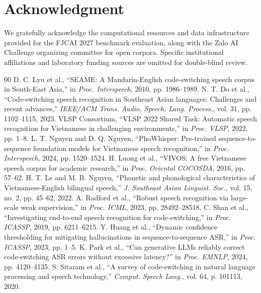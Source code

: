 \documentclass[9pt, conference, a4paper, compsocconf]{IEEEtran}
\begin{document}
\section*{Acknowledgment}
We gratefully acknowledge the computational resources and data infrastructure provided for the FJCAI 2027 benchmark evaluation, along with the Zalo AI Challenge organizing committee for open corpora. Specific institutional affiliations and laboratory funding sources are omitted for double-blind review.

\begin{thebibliography}{00}
 D. C. Lyu et al., ``SEAME: A Mandarin-English code-switching speech corpus in South-East Asia,'' in \textit{Proc. Interspeech}, 2010, pp. 1986--1989.
 N. T. Do et al., ``Code-switching speech recognition in Southeast Asian languages: Challenges and recent advances,'' \textit{IEEE/ACM Trans. Audio, Speech, Lang. Process.}, vol. 31, pp. 1102--1115, 2023.
 VLSP Consortium, ``VLSP 2022 Shared Task: Automatic speech recognition for Vietnamese in challenging environments,'' in \textit{Proc. VLSP}, 2022, pp. 1--8.
 L. T. Nguyen and D. Q. Nguyen, ``PhoWhisper: Pre-trained sequence-to-sequence foundation models for Vietnamese speech recognition,'' in \textit{Proc. Interspeech}, 2024, pp. 1520--1524.
 H. Luong et al., ``VIVOS: A free Vietnamese speech corpus for academic research,'' in \textit{Proc. Oriental COCOSDA}, 2016, pp. 57--62.
 H. T. Le and M. B. Nguyen, ``Phonetic and phonological characteristics of Vietnamese-English bilingual speech,'' \textit{J. Southeast Asian Linguist. Soc.}, vol. 15, no. 2, pp. 45--62, 2022.
 A. Radford et al., ``Robust speech recognition via large-scale weak supervision,'' in \textit{Proc. ICML}, 2023, pp. 28492--28518.
 C. Shan et al., ``Investigating end-to-end speech recognition for code-switching,'' in \textit{Proc. ICASSP}, 2019, pp. 6211--6215.
 Y. Huang et al., ``Dynamic confidence thresholding for mitigating hallucinations in sequence-to-sequence ASR,'' in \textit{Proc. ICASSP}, 2023, pp. 1--5.
 K. Park et al., ``Can generative LLMs reliably correct code-switching ASR errors without excessive latency?'' in \textit{Proc. EMNLP}, 2024, pp. 4120--4135.
 S. Sitaram et al., ``A survey of code-switching in natural language processing and speech technology,'' \textit{Comput. Speech Lang.}, vol. 64, p. 101113, 2020.

\end{thebibliography}
\end{document}
